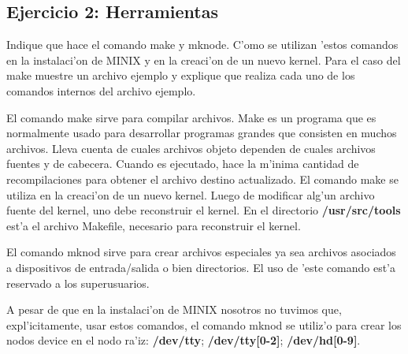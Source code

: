\subsection{Ejercicio 2: Herramientas}

Indique que hace el comando make y mknode. C'omo se utilizan 'estos comandos en la instalaci'on de MINIX y en la creaci'on de un nuevo kernel. Para el caso del make muestre un archivo ejemplo y explique que realiza cada uno de los comandos internos del archivo ejemplo.

El comando make sirve para compilar archivos. Make es un programa que es normalmente usado para desarrollar programas grandes que consisten en muchos archivos. Lleva cuenta de cuales archivos objeto dependen de cuales archivos fuentes y de cabecera. Cuando es ejecutado, hace la m'inima cantidad de recompilaciones para obtener el archivo destino actualizado.
El comando make se utiliza en la creaci'on de un nuevo kernel. Luego de modificar alg'un archivo fuente del kernel, uno debe reconstruir el kernel. En el directorio \textbf{/usr/src/tools} est'a el archivo Makefile, necesario para reconstruir el kernel.

El comando mknod sirve para crear archivos especiales ya sea archivos asociados a dispositivos de entrada/salida o bien directorios. El uso de 'este comando est'a reservado a los superusuarios.

A pesar de que en la instalaci'on de MINIX nosotros no tuvimos que, expl'icitamente, usar estos comandos, el comando mknod se utiliz'o para crear los nodos device en el nodo ra'iz: \textbf{/dev/tty}; \textbf{/dev/tty[0-2]}; \textbf{/dev/hd[0-9]}.
